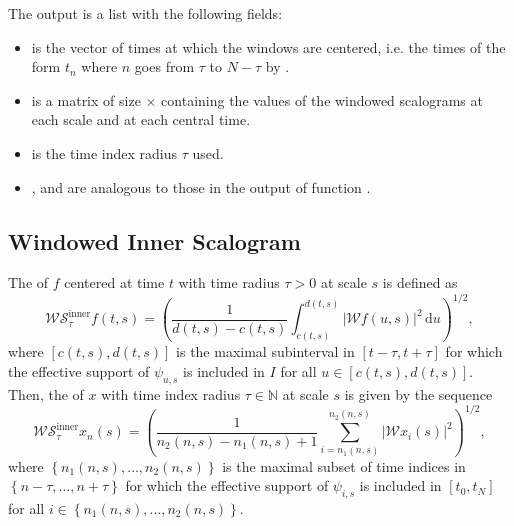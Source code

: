 The output  is a list with the following fields:
\begin{itemize}
\item {} is the vector of times at which the windows are centered, i.e. the times of the form $t_n$ where $n$ goes from $\tau $ to $N-\tau $ by .
\item {} is a matrix of size $\times$ containing the values of the windowed scalograms at each scale and at each central time.
\item {} is the time index radius $\tau $ used.
\item {},  and  are analogous to those in the output of function .
\end{itemize}

\subsection{Windowed Inner Scalogram}

The  of $f$ centered at time $t$ with time radius $\tau >0$ at scale $s$ is defined as
\begin{equation}
\label{eq:wsinnerf}
\mathcal{WS}^{\mathrm{inner}}_{\tau }f(t,s) = \left( \frac{1}{d(t,s)-c(t,s)}\int _{c(t,s)} ^{d(t,s)} | \mathcal{W}f\left( u,s\right) | ^2 \, \textrm{d}u \right)^{1/2},
\end{equation}
where $\left[ c(t,s),d(t,s)\right] $ is the maximal subinterval in $\left[ t-\tau ,t+\tau \right] $ for which the effective support of $\psi _{u,s}$ is included in $I$ for all $u\in \left[ c(t,s),d(t,s)\right] $. Then, the  of $x$ with time index radius $\tau \in \mathbb{N}$ at scale $s$ is given by the sequence
\begin{equation}
\label{eq:wsinnerx}
\mathcal{WS}^{\mathrm{inner}}_{\tau }x_n(s) = \left( \frac{1}{n_2(n,s)-n_1(n,s)+1}\sum _{i=n_1(n,s)} ^{n_2(n,s)} | \mathcal{W}x_i(s) | ^2 \right)^{1/2},
\end{equation}
where $\left\{ n_1(n,s),\ldots ,n_2(n,s)\right\} $ is the maximal subset of time indices in $\left\{ n-\tau ,\ldots ,n+\tau \right\} $ for which the effective support of $\psi _{i,s}$ is included in $\left[ t_0,t_N\right] $ for all $i\in \left\{ n_1(n,s),\ldots ,n_2(n,s)\right\} $.


